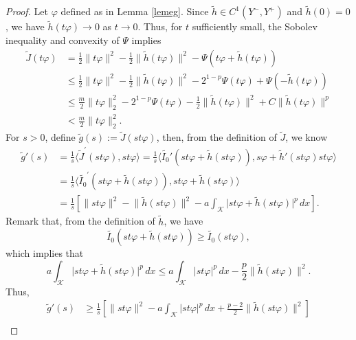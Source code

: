 \documentclass[11pt]{amsart}
\newcommand{\abs}[1]{\lvert#1\rvert}
\newcommand{\norm}[1]{\lVert#1\rVert}
\newcommand{\K}{\mathcal{K}}
\numberwithin{equation}{section}
\begin{document}
\begin{proof}
    Let $\varphi$ defined as in Lemma \ref{lemeg}. Since $\widetilde{h} \in C^1(Y^-,Y^+)$ and $\widetilde{h}(0) = 0$, we have $\widetilde{h}(t\varphi) \to 0$ as $t \to 0$. Thus, for $t$ sufficiently small, the Sobolev inequality and convexity of $\Psi$ implies
    \begin{equation}\label{eqjsmallm-a}
            \begin{aligned}
                \widetilde{J}(t\varphi) &= \frac{1}{2}\norm{t\varphi}^2-\frac{1}{2}\norm{\widetilde{h}(t\varphi)}^2 - \Psi(t\varphi+\widetilde{h}(t\varphi))\\
                &\leq \frac{1}{2}\norm{t\varphi}^2-\frac{1}{2}\norm{\widetilde{h}(t\varphi)}^2 - 2^{1-p}\Psi(t\varphi) + \Psi(-\widetilde{h}(t\varphi))\\
                &\leq \frac{m}{2}\norm{t\varphi}_2^2 - 2^{1-p}\Psi(t\varphi) -\frac{1}{2} \norm{\widetilde{h}(t\varphi)}^2 + C\norm{\widetilde{h}(t\varphi)}^p\\
                &< \frac{m}{2}\norm{t\varphi}_2^2.
    \end{aligned}
    \end{equation}
For $s>0$, define $\widetilde{g}(s):=\widetilde{J}(st\varphi)$, then, from the definition of $\widetilde{J}$, we know
$$
\begin{aligned}
\widetilde{g}'(s) & =\frac{1}{s}\langle \widetilde{J}^{\prime}(st\varphi), st\varphi\rangle=\frac{1}{s}\langle \widetilde{I_0}'(st\varphi+\widetilde{h}(st\varphi)), s \varphi+\widetilde{h}'(st\varphi) st\varphi\rangle \\
& =\frac{1}{s}\langle \widetilde{I_0}^{\prime}(st\varphi+\widetilde{h}(st\varphi)), st\varphi + \widetilde{h}(st\varphi)\rangle \\
& =\frac{1}{s}\left[\norm{st\varphi}^2-\norm{\widetilde{h}(st\varphi)}^2-a\int_{\K} \abs{st\varphi + \widetilde{h}(st\varphi)}^p \,dx\right].
\end{aligned}
$$
Remark that, from the definition of $\widetilde{h}$, we have
$$
\widetilde{I_0}(st\varphi+\widetilde{h}(st\varphi)) \geq \widetilde{I_0}(st\varphi),
$$
which implies that
$$
a\int_{\K}\abs{st\varphi+\widetilde{h}(st\varphi)}^{p}\,dx \leq a\int_{\K}\abs{st\varphi}^{p} \,dx-\frac{p}{2}\norm{\widetilde{h}(st\varphi)}^{2}.
$$
Thus,
$$
\begin{aligned}
\widetilde{g}'(s) & \geq \frac{1}{s}\left[\norm{st\varphi}^{2}-a\int_{\K}\abs{st\varphi}^{p}\,dx+\frac{p-2}{2}\norm{\widetilde{h}(st\varphi)}^{2}\right] \\

\end{aligned}$$
\end{proof}
\end{document}
